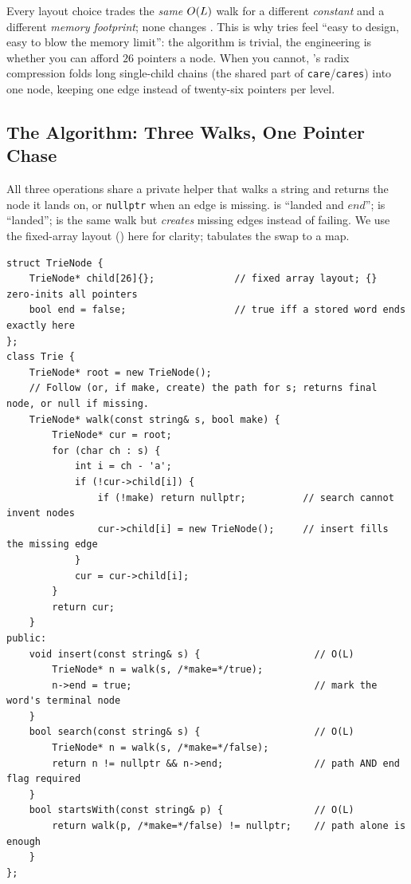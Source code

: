 \begin{insightbox}
Every layout choice trades the \emph{same} $O(L)$ walk for a different \emph{constant} and a
different \emph{memory footprint}; none changes . This is why tries feel
``easy to design, easy to blow the memory limit'': the algorithm is trivial, the engineering is
whether you can afford $26$ pointers a node. When you cannot, 's radix compression
folds long single-child chains (the shared part of \texttt{care}/\texttt{cares}) into one node, keeping
one edge instead of twenty-six pointers per level.
\end{insightbox}

\subsection{The Algorithm: Three Walks, One Pointer Chase}

All three operations share a private helper that walks a string and returns the node it lands on, or
\texttt{nullptr} when an edge is missing.  is ``landed and $\mathit{end}$''; 
is ``landed'';  is the same walk but \emph{creates} missing edges instead of failing. We use
the fixed-array layout () here for clarity;  tabulates the swap to
a map.

\begin{lstlisting}[caption={Hand-written string trie: one \code{walk} helper, and insert / search / startsWith}, label={lst:c08-trie-ops}]
struct TrieNode {
    TrieNode* child[26]{};              // fixed array layout; {} zero-inits all pointers
    bool end = false;                   // true iff a stored word ends exactly here
};
class Trie {
    TrieNode* root = new TrieNode();
    // Follow (or, if make, create) the path for s; returns final node, or null if missing.
    TrieNode* walk(const string& s, bool make) {
        TrieNode* cur = root;
        for (char ch : s) {
            int i = ch - 'a';
            if (!cur->child[i]) {
                if (!make) return nullptr;          // search cannot invent nodes
                cur->child[i] = new TrieNode();     // insert fills the missing edge
            }
            cur = cur->child[i];
        }
        return cur;
    }
public:
    void insert(const string& s) {                    // O(L)
        TrieNode* n = walk(s, /*make=*/true);
        n->end = true;                                // mark the word's terminal node
    }
    bool search(const string& s) {                    // O(L)
        TrieNode* n = walk(s, /*make=*/false);
        return n != nullptr && n->end;                // path AND end flag required
    }
    bool startsWith(const string& p) {                // O(L)
        return walk(p, /*make=*/false) != nullptr;    // path alone is enough
    }
};
\end{lstlisting}

